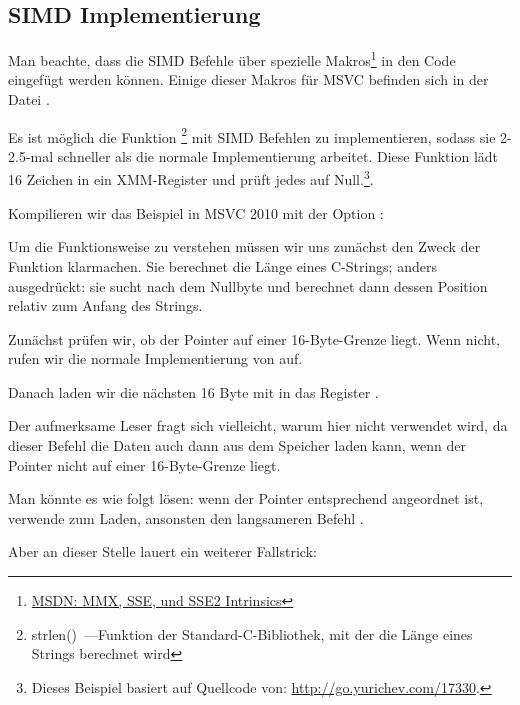 \subsection{SIMD \strlen Implementierung}
\label{SIMD_strlen}

\newcommand{\URLMSDNSSE}{\href{http://go.yurichev.com/17262}{MSDN: MMX, SSE, und SSE2 Intrinsics}}
Man beachte, dass die \ac{SIMD} Befehle über spezielle Makros\footnote{\URLMSDNSSE} in den \CCpp Code eingefügt werden
können. Einige dieser Makros für MSVC befinden sich in der Datei .

\newcommand{\URLSTRLEN}{http://go.yurichev.com/17330}

Es ist möglich die Funktion \strlen\footnote{strlen()~---Funktion der Standard-C-Bibliothek, mit der die Länge eines
Strings berechnet wird} mit SIMD Befehlen zu implementieren, sodass sie 2-2.5-mal schneller als die normale
Implementierung arbeitet. Diese Funktion lädt 16 Zeichen in ein XMM-Register und prüft jedes auf Null.\footnote{Dieses
Beispiel basiert auf Quellcode von: \url{\URLSTRLEN}.}.



Kompilieren wir das Beispiel in MSVC 2010 mit der Option \Ox:



Um die Funktionsweise zu verstehen müssen wir uns zunächst den Zweck der Funktion klarmachen. Sie berechnet die Länge
eines C-Strings; anders ausgedrückt: sie sucht nach dem Nullbyte und berechnet dann dessen Position relativ zum Anfang
des Strings.

Zunächst prüfen wir, ob der  Pointer auf einer 16-Byte-Grenze liegt. Wenn nicht, rufen wir die normale
Implementierung von \strlen auf.

Danach laden wir die nächsten 16 Byte mit \MOVDQA in das Register .

Der aufmerksame Leser fragt sich vielleicht, warum hier \MOVDQU nicht verwendet wird, da dieser Befehl die Daten auch
dann aus dem Speicher laden kann, wenn der Pointer nicht auf einer 16-Byte-Grenze liegt.

Man könnte es wie folgt lösen: wenn der Pointer entsprechend angeordnet ist, verwende \MOVDQA zum Laden, ansonsten den
langsameren Befehl \MOVDQU.

Aber an dieser Stelle lauert ein weiterer Fallstrick:

